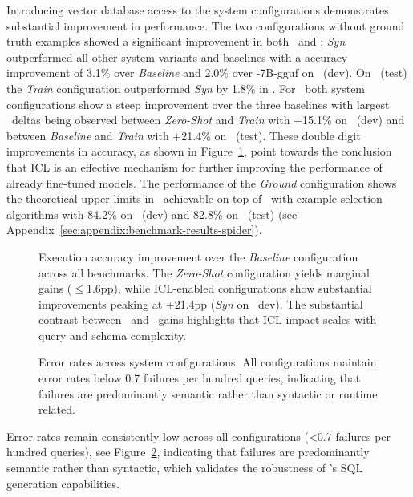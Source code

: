 Introducing vector database access to the system configurations demonstrates
substantial improvement in performance. The two configurations without ground
truth examples showed a significant improvement in both \EA~and \EM:
\textit{Syn} outperformed all other system variants and baselines with a
accuracy improvement of 3.1\% over \textit{Baseline} and 2.0\% over
\OmniSQL-7B-gguf on \Spider~(dev). On \Spider~(test) the \textit{Train}
configuration outperformed \textit{Syn} by 1.8\% in \EA. For \EM~both system
configurations show a steep improvement over the three baselines with largest
\EM~deltas being observed between \textit{Zero-Shot} and \textit{Train} with
+15.1\% on \Spider~(dev) and between \textit{Baseline} and \textit{Train} with
+21.4\% on \Spider~(test). These double digit improvements in accuracy, as shown
in Figure~\ref{fig:eval:baseline-improvement-ea}, point
towards the conclusion that ICL is an effective mechanism for further improving
the performance of already fine-tuned models. The performance
of the \textit{Ground} configuration shows the theoretical upper limits in
\EA~achievable on top of \OmniSQL~with example selection algorithms with 84.2\%
on \Spider~(dev) and 82.8\% on \Spider~(test)
(see Appendix~\ref{sec:appendix:benchmark-results-spider}).

\begin{figure}[htbp]
  \centering
  
  \caption{
    Execution accuracy improvement over the \textit{Baseline} configuration
    across all benchmarks. The \textit{Zero-Shot} configuration yields marginal
    gains ($\leq$1.6pp), while ICL-enabled configurations show substantial
    improvements peaking at +21.4pp (\textit{Syn} on \Bird~dev). The substantial
    contrast between \Spider~and \Bird~gains highlights that ICL impact scales
    with query and schema complexity.
  }
  \label{fig:eval:baseline-improvement-ea}
\end{figure}

\begin{figure}[htbp]
  \centering
  
  \caption{
      Error rates across system configurations. All configurations
      maintain error rates below 0.7 failures per hundred queries, indicating
      that failures are predominantly semantic rather than syntactic or runtime
      related.
  }
  \label{fig:eval:error-rates}
\end{figure}

Error rates remain consistently low across all configurations (<0.7 failures
per hundred queries), see Figure~\ref{fig:eval:error-rates}, indicating that
failures are predominantly semantic rather than syntactic, which validates
the robustness of \OmniSQL's SQL generation capabilities.

